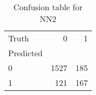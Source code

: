 \begin{table}[h!]
\caption{Confusion table for NN2}
\label{tab:NN2}
\begin{tabular}{lrr}
\toprule
Truth & 0 & 1 \\
Predicted &  &  \\
\midrule
0 & 1527 & 185 \\
1 & 121 & 167 \\
\bottomrule
\end{tabular}
\end{table}
